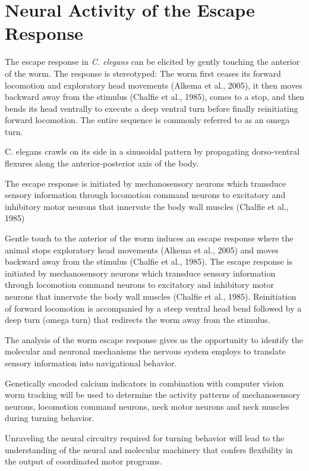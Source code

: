 \section{Neural Activity of the Escape Response}
The escape response in \textit{C. elegans} can be elicited by gently touching the anterior of the worm. The response is  stereotyped: The worm first ceases its forward locomotion and exploratory head movements (Alkema et al., 2005), it then moves backward away from the stimulus (Chalfie et al., 1985), comes to a stop, and then bends its head ventrally to execute a deep ventral turn before finally reinitiating forward locomotion.  The entire sequence is commonly referred to as an omega turn. 




C. elegans crawls on its side in a sinusoidal pattern by propagating dorso-ventral flexures along the anterior-posterior axis of the body.  






 The escape response is initiated by mechanosensory neurons which transduce sensory information through locomotion command neurons to excitatory and inhibitory motor neurons that innervate the body wall muscles (Chalfie et al., 1985)



Gentle touch to the anterior of the worm induces an escape response where the animal stops exploratory head movements (Alkema et al., 2005) and moves backward away from the stimulus (Chalfie et al., 1985).  The escape response is initiated by mechanosensory neurons which transduce sensory information through locomotion command neurons to excitatory and inhibitory motor neurons that innervate the body wall muscles (Chalfie et al., 1985).  Reinitiation of forward locomotion is accompanied by a steep ventral head bend followed by a deep turn (omega turn) that redirects the worm away from the stimulus.  

The analysis of the worm escape response gives us the  opportunity to identify the molecular and neuronal mechanisms  the nervous system employs to translate sensory information into navigational behavior. 

Genetically encoded calcium indicators in combination with  computer vision worm tracking will be used to determine the activity patterns of mechanosensory neurons, locomotion command neurons, neck motor neurons and neck muscles during turning behavior.  

Unraveling the neural circuitry required for turning behavior will lead to the understanding of the neural and molecular machinery that confers flexibility in the output of coordinated motor programs.



